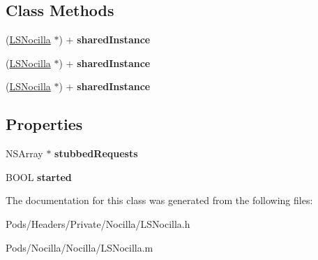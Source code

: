 \subsection*{Class Methods}
\begin{DoxyCompactItemize}
\item 
\hypertarget{interface_l_s_nocilla_aacdf70e8ef1b30ac6ea2b6ad52b8bc6f}{(\hyperlink{interface_l_s_nocilla}{L\-S\-Nocilla} $\ast$) + {\bfseries shared\-Instance}}\label{interface_l_s_nocilla_aacdf70e8ef1b30ac6ea2b6ad52b8bc6f}

\item 
\hypertarget{interface_l_s_nocilla_aacdf70e8ef1b30ac6ea2b6ad52b8bc6f}{(\hyperlink{interface_l_s_nocilla}{L\-S\-Nocilla} $\ast$) + {\bfseries shared\-Instance}}\label{interface_l_s_nocilla_aacdf70e8ef1b30ac6ea2b6ad52b8bc6f}

\item 
\hypertarget{interface_l_s_nocilla_aacdf70e8ef1b30ac6ea2b6ad52b8bc6f}{(\hyperlink{interface_l_s_nocilla}{L\-S\-Nocilla} $\ast$) + {\bfseries shared\-Instance}}\label{interface_l_s_nocilla_aacdf70e8ef1b30ac6ea2b6ad52b8bc6f}

\end{DoxyCompactItemize}
\subsection*{Properties}
\begin{DoxyCompactItemize}
\item 
\hypertarget{interface_l_s_nocilla_a2bb0d5a00ea758923cb631f03ca313d2}{N\-S\-Array $\ast$ {\bfseries stubbed\-Requests}}\label{interface_l_s_nocilla_a2bb0d5a00ea758923cb631f03ca313d2}

\item 
\hypertarget{interface_l_s_nocilla_a316a53b78205287bc3c405242e508278}{B\-O\-O\-L {\bfseries started}}\label{interface_l_s_nocilla_a316a53b78205287bc3c405242e508278}

\end{DoxyCompactItemize}


The documentation for this class was generated from the following files\-:\begin{DoxyCompactItemize}
\item 
Pods/\-Headers/\-Private/\-Nocilla/L\-S\-Nocilla.\-h\item 
Pods/\-Nocilla/\-Nocilla/L\-S\-Nocilla.\-m\end{DoxyCompactItemize}
